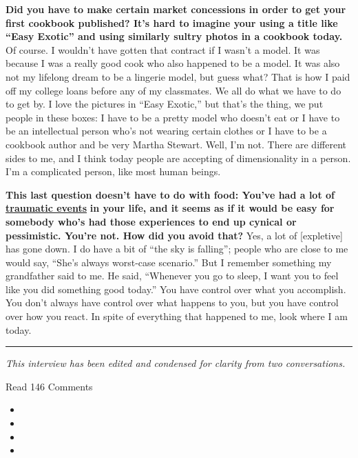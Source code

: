 \textbf{Did you have to make certain market concessions in order to get
your first cookbook published? It's hard to imagine your using a title
like ``Easy Exotic'' and using similarly sultry photos in a cookbook
today.} Of course. I wouldn't have gotten that contract if I wasn't a
model. It was because I was a really good cook who also happened to be a
model. It was also not my lifelong dream to be a lingerie model, but
guess what? That is how I paid off my college loans before any of my
classmates. We all do what we have to do to get by. I love the pictures
in ``Easy Exotic,'' but that's the thing, we put people in these boxes:
I have to be a pretty model who doesn't eat or I have to be an
intellectual person who's not wearing certain clothes or I have to be a
cookbook author and be very Martha Stewart. Well, I'm not. There are
different sides to me, and I think today people are accepting of
dimensionality in a person. I'm a complicated person, like most human
beings.

\textbf{This last question doesn't have to do with food: You've had a
lot of} \textbf{\href{http://nytimes.com\#tooltip-12}{traumatic events}}
\textbf{in your life, and it seems as if it would be easy for somebody
who's had those experiences to end up cynical or pessimistic. You're
not. How did you avoid that?} Yes, a lot of {[}expletive{]} has gone
down. I do have a bit of ``the sky is falling''; people who are close to
me would say, ``She's always worst-case scenario.'' But I remember
something my grandfather said to me. He said, ``Whenever you go to
sleep, I want you to feel like you did something good today.'' You have
control over what you accomplish. You don't always have control over
what happens to you, but you have control over how you react. In spite
of everything that happened to me, look where I am today.

\begin{center}\rule{0.5\linewidth}{\linethickness}\end{center}

\emph{This interview has been edited and condensed for clarity from two
conversations.}

Read 146 Comments

\begin{itemize}
\item
\item
\item
\item
\end{itemize}


